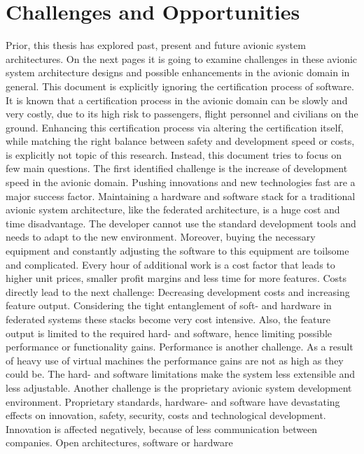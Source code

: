 \documentclass[titlepage]{report}
\begin{document}
\section{Challenges and Opportunities}\label{section:Challenges_And_Opportunities}
Prior, this thesis has explored past, present and future avionic system architectures. On the next pages it is going to examine
challenges in these avionic system architecture designs and possible enhancements in the avionic domain in general. This document is explicitly ignoring the certification
process of software. It is known that a certification process in the avionic domain can be slowly and very costly, due to its
high risk to passengers, flight personnel and civilians on the ground. Enhancing this certification process via altering the certification itself, while matching the right balance between safety
and development speed or costs, is explicitly not topic of this research. Instead, this document tries to focus on few main questions.
The first identified challenge is the increase of development speed in the avionic domain. Pushing innovations and new technologies fast are a major
success factor. Maintaining a hardware and software stack for a traditional avionic system architecture, like the federated architecture, is a
huge cost and time disadvantage. The developer cannot use the standard development tools and needs to adapt to the new environment. Moreover,
buying the necessary equipment and constantly adjusting the software to this equipment are toilsome and complicated. Every hour of additional
work is a cost factor that leads to higher unit prices, smaller profit margins and less time for more features. Costs directly lead to the next
challenge: Decreasing development costs and increasing feature output. Considering the tight entanglement of soft- and hardware in federated systems
these stacks become very cost intensive. Also, the feature output is limited to the required hard- and software,
hence limiting possible performance or functionality gains. Performance is another challenge. As a result of heavy use of virtual machines the performance
gains are not as high as they could be. The hard- and software limitations make the system less extensible and less adjustable. Another challenge is the
proprietary avionic system development environment. Proprietary standards, hardware- and software have devastating effects on innovation, safety, security,
costs and technological development. Innovation is affected negatively, because of less communication between companies. Open architectures, software or hardware
\end{document}
